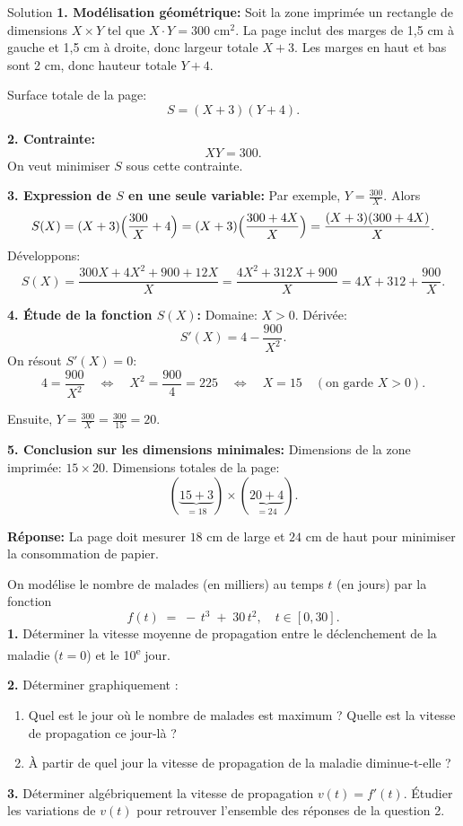 \documentclass[a4paper,12pt]{article}
\begin{document}
\begin{solutionbox}{Solution}
\textbf{1. Modélisation géométrique:}  
Soit la zone imprimée un rectangle de dimensions $X\times Y$ tel que $X\cdot Y=300$ cm$^2$.  
La page inclut des marges de 1,5 cm à gauche et 1,5 cm à droite, donc largeur totale $X+3$.  
Les marges en haut et bas sont 2 cm, donc hauteur totale $Y+4$.

Surface totale de la page:
$$
S= (X+3)(Y+4).
$$

\textbf{2. Contrainte:}  
$$
XY=300.
$$
On veut minimiser $S$ sous cette contrainte.

\textbf{3. Expression de $S$ en une seule variable:}  
Par exemple, $Y=\frac{300}{X}$.  
Alors
$$
S(X) = (X+3)\Bigl(\frac{300}{X}+4\Bigr)
= (X+3)\Bigl(\frac{300+4X}{X}\Bigr)
= \frac{(X+3)(300+4X)}{X}.
$$
Développons:
$$
S(X)= \frac{300X +4X^2+900+12X}{X}
= \frac{4X^2 +312X +900}{X}
=4X +312 + \frac{900}{X}.
$$

\textbf{4. Étude de la fonction $S(X)$:}  
Domaine: $X>0.$  
Dérivée:
$$
S'(X)=4 - \frac{900}{X^2}.
$$
On résout $S'(X)=0$:
$$
4 = \frac{900}{X^2}
\quad\Longleftrightarrow\quad
X^2=\frac{900}{4}=225
\quad\Longleftrightarrow\quad
X=15 \quad (\text{on garde }X>0).
$$

Ensuite, $Y=\frac{300}{X}= \frac{300}{15}=20.$

\textbf{5. Conclusion sur les dimensions minimales:}  
Dimensions de la zone imprimée: $15 \times 20.$  
Dimensions totales de la page:  
$$
(\underbrace{15+3}_{=18}) \times (\underbrace{20+4}_{=24}).
$$

\textbf{Réponse:}  
La page doit mesurer $18$ cm de large et $24$ cm de haut pour minimiser la consommation de papier.
\end{solutionbox}

\begin{exercice}[title=Exercice : Étudier la propagation d’une maladie -- vitesse et dérivation]
On modélise le nombre de malades (en milliers) au temps $t$ (en jours) par la fonction
$$
f(t) \;=\; -\,t^3 \;+\; 30\,t^2,
\quad t \in [0,30].
$$
\textbf{1.} Déterminer la vitesse moyenne de propagation entre le déclenchement de la maladie ($t=0$) et le 10\textsuperscript{e} jour.  

\textbf{2.} Déterminer graphiquement :  
\begin{enumerate}
  \item[(a)] Quel est le jour où le nombre de malades est maximum ? Quelle est la vitesse de propagation ce jour-là ?
  \item[(b)] À partir de quel jour la vitesse de propagation de la maladie diminue-t-elle ?
\end{enumerate}

\textbf{3.} Déterminer algébriquement la vitesse de propagation $v(t) = f'(t)$. Étudier les variations de $v(t)$ pour retrouver l’ensemble des réponses de la question 2.
\end{exercice}
\end{document}
